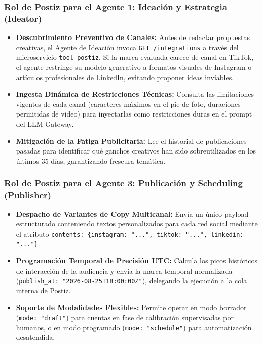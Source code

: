 \documentclass[11pt,a4paper]{article}
\begin{document}
\subsubsection{Rol de Postiz para el Agente 1: Ideación y Estrategia (Ideator)}
\begin{itemize}[leftmargin=*]
    \item \textbf{Descubrimiento Preventivo de Canales:} Antes de redactar propuestas creativas, el Agente de Ideación invoca \texttt{GET /integrations} a través del microservicio \texttt{tool-postiz}. Si la marca evaluada carece de canal en TikTok, el agente restringe su modelo generativo a formatos visuales de Instagram o artículos profesionales de LinkedIn, evitando proponer ideas inviables.
    \item \textbf{Ingesta Dinámica de Restricciones Técnicas:} Consulta las limitaciones vigentes de cada canal (caracteres máximos en el pie de foto, duraciones permitidas de video) para inyectarlas como restricciones duras en el prompt del LLM Gateway.
    \item \textbf{Mitigación de la Fatiga Publicitaria:} Lee el historial de publicaciones pasadas para identificar qué ganchos creativos han sido sobreutilizados en los últimos 35 días, garantizando frescura temática.
\end{itemize}

\subsubsection{Rol de Postiz para el Agente 3: Publicación y Scheduling (Publisher)}
\begin{itemize}[leftmargin=*]
    \item \textbf{Despacho de Variantes de Copy Multicanal:} Envía un único payload estructurado conteniendo textos personalizados para cada red social mediante el atributo \texttt{contents: \{instagram: "...", tiktok: "...", linkedin: "..."\}}.
    \item \textbf{Programación Temporal de Precisión UTC:} Calcula los picos históricos de interacción de la audiencia y envía la marca temporal normalizada (\texttt{publish\_at: "2026-08-25T18:00:00Z"}), delegando la ejecución a la cola interna de Postiz.
    \item \textbf{Soporte de Modalidades Flexibles:} Permite operar en modo borrador (\texttt{mode: "draft"}) para cuentas en fase de calibración supervisadas por humanos, o en modo programado (\texttt{mode: "schedule"}) para automatización desatendida.
\end{itemize}
\end{document}
